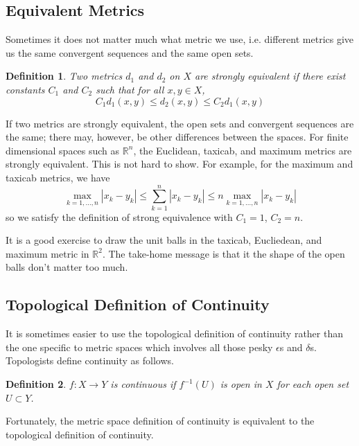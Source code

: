 \documentclass[10pt]{article}         %
\newtheorem{definition}{Definition}[section]
\theoremstyle{remark}
\newcommand{\R}{\mathbb{R}}
\begin{document}
\subsection{Equivalent Metrics}

Sometimes it does not matter much what metric we use, i.e. different metrics give us the same convergent sequences and the same open sets. 

\begin{definition}
Two metrics $d_1$ and $d_2$ on $X$ are \emph{strongly equivalent} if there exist constants $C_1$ and $C_2$ such that for all $x, y \in X$,
\[
C_1 d_1(x,y) \leq d_2(x,y) \leq C_2 d_1(x,y)
\]
\end{definition}

If two metrics are strongly equivalent, the open sets and convergent sequences are the same; there may, however, be other differences between the spaces. For finite dimensional spaces such as $\R^n$, the Euclidean, taxicab, and maximum metrics are strongly equivalent. This is not hard to show. For example, for the maximum and taxicab metrics, we have
\[
\max_{k=1, \dots, n}|x_k - y_k| \leq \sum_{k=1}^n |x_k - y_k| \leq n \max_{k=1, \dots, n}|x_k - y_k|
\]
so we satisfy the definition of strong equivalence with $C_1 = 1$, $C_2 = n$.

It is a good exercise to draw the unit balls in the taxicab, Eucliedean, and maximum metric in $\R^2$. The take-home message is that it the shape of the open balls don't matter too much.

\subsection{Topological Definition of Continuity}

It is sometimes easier to use the topological definition of continuity rather than the one specific to metric spaces which involves all those pesky $\epsilon$s and $\delta$s. Topologists define continuity as follows.

\begin{definition}
$f: X \rightarrow Y$ is continuous if $f^{-1}(U)$ is open in $X$ for each open set $U \subset Y$.
\end{definition}

Fortunately, the metric space definition of continuity is equivalent to the topological definition of continuity. 
\end{document}
